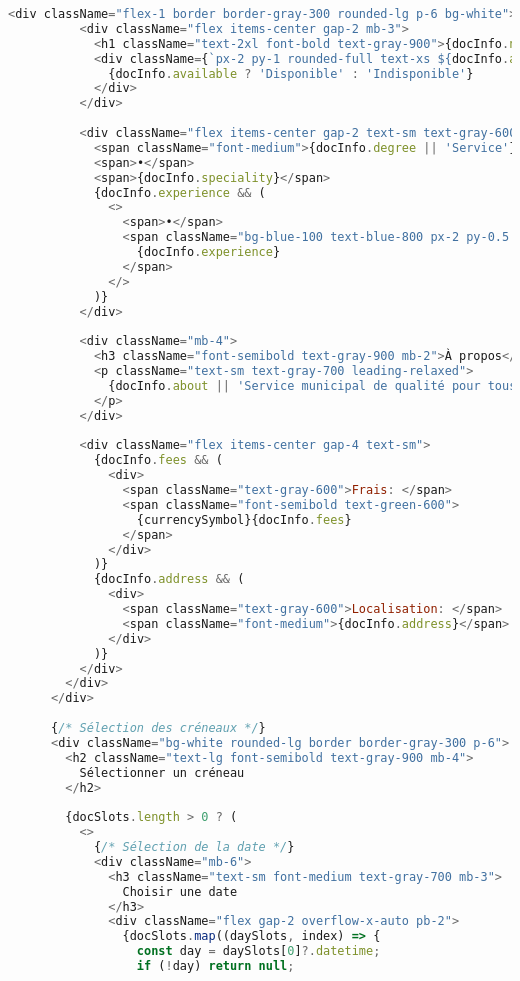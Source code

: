 \begin{lstlisting}[language=JavaScript, caption=AppointmentForm.jsx - Formulaire de réservation avec validation]
        <div className="flex-1 border border-gray-300 rounded-lg p-6 bg-white">
          <div className="flex items-center gap-2 mb-3">
            <h1 className="text-2xl font-bold text-gray-900">{docInfo.name}</h1>
            <div className={`px-2 py-1 rounded-full text-xs ${docInfo.available ? 'bg-green-100 text-green-800' : 'bg-red-100 text-red-800'}`}>
              {docInfo.available ? 'Disponible' : 'Indisponible'}
            </div>
          </div>
          
          <div className="flex items-center gap-2 text-sm text-gray-600 mb-4">
            <span className="font-medium">{docInfo.degree || 'Service'}</span>
            <span>•</span>
            <span>{docInfo.speciality}</span>
            {docInfo.experience && (
              <>
                <span>•</span>
                <span className="bg-blue-100 text-blue-800 px-2 py-0.5 rounded">
                  {docInfo.experience}
                </span>
              </>
            )}
          </div>
          
          <div className="mb-4">
            <h3 className="font-semibold text-gray-900 mb-2">À propos</h3>
            <p className="text-sm text-gray-700 leading-relaxed">
              {docInfo.about || 'Service municipal de qualité pour tous les citoyens d\'Azrou.'}
            </p>
          </div>
          
          <div className="flex items-center gap-4 text-sm">
            {docInfo.fees && (
              <div>
                <span className="text-gray-600">Frais: </span>
                <span className="font-semibold text-green-600">
                  {currencySymbol}{docInfo.fees}
                </span>
              </div>
            )}
            {docInfo.address && (
              <div>
                <span className="text-gray-600">Localisation: </span>
                <span className="font-medium">{docInfo.address}</span>
              </div>
            )}
          </div>
        </div>
      </div>
      
      {/* Sélection des créneaux */}
      <div className="bg-white rounded-lg border border-gray-300 p-6">
        <h2 className="text-lg font-semibold text-gray-900 mb-4">
          Sélectionner un créneau
        </h2>
        
        {docSlots.length > 0 ? (
          <>
            {/* Sélection de la date */}
            <div className="mb-6">
              <h3 className="text-sm font-medium text-gray-700 mb-3">
                Choisir une date
              </h3>
              <div className="flex gap-2 overflow-x-auto pb-2">
                {docSlots.map((daySlots, index) => {
                  const day = daySlots[0]?.datetime;
                  if (!day) return null;
                  

\end{lstlisting}
